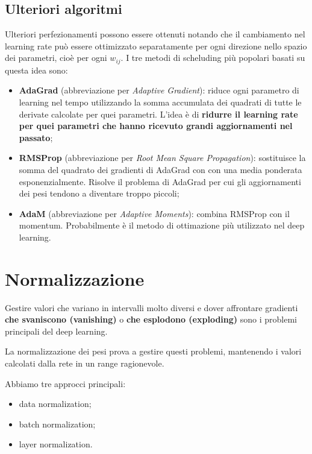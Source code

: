 \subsection{Ulteriori algoritmi}
Ulteriori perfezionamenti possono essere ottenuti notando che il cambiamento nel learning rate può essere ottimizzato separatamente per ogni direzione nello spazio dei parametri, cioè per ogni $w_{ij}$. I tre metodi di scheluding più popolari basati su questa idea sono:
\begin{itemize}
    \item \textbf{AdaGrad} (abbreviazione per \textit{Adaptive Gradient}): riduce ogni parametro di learning nel tempo utilizzando la somma accumulata dei quadrati di tutte le derivate calcolate per quei parametri. L'idea è di \textbf{ridurre il learning rate per quei parametri che hanno ricevuto grandi aggiornamenti nel passato};
    \item \textbf{RMSProp} (abbreviazione per \textit{Root Mean Square Propagation}): sostituisce la somma del quadrato dei gradienti di AdaGrad con con una media ponderata esponenzialmente. Risolve il problema di AdaGrad per cui gli aggiornamenti dei pesi tendono a diventare troppo piccoli;
    \item \textbf{AdaM} (abbreviazione per \textit{Adaptive Moments}): combina RMSProp con il momentum. Probabilmente è il metodo di ottimazione più utilizzato nel deep learning.
\end{itemize} 
\newpage
\section{Normalizzazione}
Gestire valori che variano in intervalli molto diversi e dover affrontare gradienti \textbf{che svaniscono (vanishing)} o \textbf{che esplodono (exploding)} sono i problemi principali del deep learning.


La normalizzazione dei pesi prova a gestire questi problemi, mantenendo i valori calcolati dalla rete in un range ragionevole. 


Abbiamo tre approcci principali:
\begin{itemize}
    \item data normalization;
    \item batch normalization;
    \item layer normalization.
\end{itemize}

